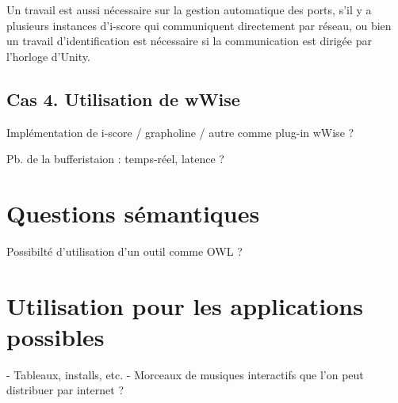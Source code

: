 \documentclass[french,12pt,a4paper]{article}
\begin{document}
Un travail est aussi nécessaire sur la gestion automatique des ports, s'il y a plusieurs instances d'i-score qui communiquent directement par réseau, ou bien un travail d'identification est nécessaire si la communication est dirigée par l'horloge d'Unity.
\subsection{Cas 4. Utilisation de wWise }
Implémentation de i-score / grapholine / autre comme plug-in wWise ?

Pb. de la bufferistaion : temps-réel, latence ?

\section{Questions sémantiques}
Possibilté d'utilisation d'un outil comme OWL ?

\section{Utilisation pour les applications possibles}
- Tableaux, installs, etc.
- Morceaux de musiques interactifs que l'on peut distribuer par internet ?
\end{document}
